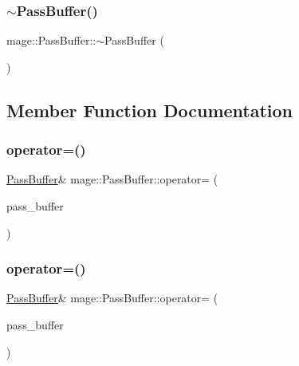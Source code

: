 \hypertarget{structmage_1_1_pass_buffer_a650dec579522b7d5c5810a535b10773a}{}\label{structmage_1_1_pass_buffer_a650dec579522b7d5c5810a535b10773a} 
\subsubsection{\texorpdfstring{$\sim$\+Pass\+Buffer()}{~PassBuffer()}}
{\footnotesize\ttfamily mage\+::\+Pass\+Buffer\+::$\sim$\+Pass\+Buffer (\begin{DoxyParamCaption}{ }\end{DoxyParamCaption})\hspace{0.3cm}{\ttfamily [default]}}



\subsection{Member Function Documentation}
\hypertarget{structmage_1_1_pass_buffer_a8d0cc48dea7dfb6b710b6162b3a82b7e}{}\label{structmage_1_1_pass_buffer_a8d0cc48dea7dfb6b710b6162b3a82b7e} 
\subsubsection{\texorpdfstring{operator=()}{operator=()}\hspace{0.1cm}{\footnotesize\ttfamily [1/2]}}
{\footnotesize\ttfamily \hyperlink{structmage_1_1_pass_buffer}{Pass\+Buffer}\& mage\+::\+Pass\+Buffer\+::operator= (\begin{DoxyParamCaption}\item[{const \hyperlink{structmage_1_1_pass_buffer}{Pass\+Buffer} \&}]{pass\+\_\+buffer }\end{DoxyParamCaption})\hspace{0.3cm}{\ttfamily [delete]}}

\hypertarget{structmage_1_1_pass_buffer_a8a5832066c415bea077107c7a9d18df5}{}\label{structmage_1_1_pass_buffer_a8a5832066c415bea077107c7a9d18df5} 
\subsubsection{\texorpdfstring{operator=()}{operator=()}\hspace{0.1cm}{\footnotesize\ttfamily [2/2]}}
{\footnotesize\ttfamily \hyperlink{structmage_1_1_pass_buffer}{Pass\+Buffer}\& mage\+::\+Pass\+Buffer\+::operator= (\begin{DoxyParamCaption}\item[{\hyperlink{structmage_1_1_pass_buffer}{Pass\+Buffer} \&\&}]{pass\+\_\+buffer }\end{DoxyParamCaption})\hspace{0.3cm}{\ttfamily [delete]}}



